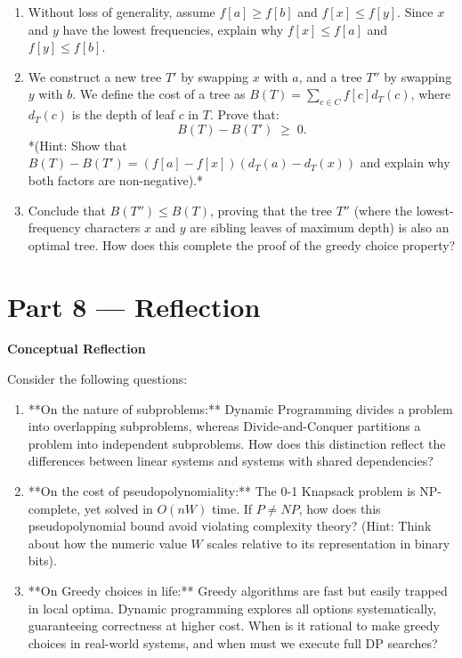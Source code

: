 \documentclass[12pt, a4paper]{book}
\begin{document}
\begin{deepbox}
\begin{enumerate}[label=\textbf{D\arabic*.}]
        \begin{enumerate}[label=(\alph*)]
          \item Without loss of generality, assume $f[a] \ge f[b]$ and $f[x] \le f[y]$.
                Since $x$ and $y$ have the lowest frequencies, explain why $f[x] \le f[a]$ and $f[y] \le f[b]$.
          \item We construct a new tree $T'$ by swapping $x$ with $a$, and a tree $T''$ by swapping $y$ with $b$.
                We define the cost of a tree as $B(T) = \sum_{c \in C} f[c] d_T(c)$, where $d_T(c)$ is the depth of leaf $c$ in $T$.
                Prove that:
                \[
                  B(T) - B(T') \;\ge\; 0.
                \]
                *(Hint: Show that $B(T) - B(T') = (f[a] - f[x])(d_T(a) - d_T(x))$ and explain why both factors are non-negative).*
          \item Conclude that $B(T'') \le B(T)$, proving that the tree $T''$ (where the lowest-frequency characters $x$ and $y$ are sibling leaves of maximum depth) is also an optimal tree.
                How does this complete the proof of the greedy choice property?
        \end{enumerate}
\end{enumerate}
\end{deepbox}

\newpage

\section{Part 8 --- Reflection}

\begin{reflectionbox}
\textbf{Conceptual Reflection}

Consider the following questions:
\begin{enumerate}
  \item **On the nature of subproblems:** Dynamic Programming divides a problem into overlapping subproblems, whereas Divide-and-Conquer partitions a problem into independent subproblems. How does this distinction reflect the differences between linear systems and systems with shared dependencies?
  \item **On the cost of pseudopolynomiality:** The 0-1 Knapsack problem is NP-complete, yet solved in $O(n W)$ time. If $P \neq NP$, how does this pseudopolynomial bound avoid violating complexity theory? (Hint: Think about how the numeric value $W$ scales relative to its representation in binary bits).
  \item **On Greedy choices in life:** Greedy algorithms are fast but easily trapped in local optima. Dynamic programming explores all options systematically, guaranteeing correctness at higher cost. When is it rational to make greedy choices in real-world systems, and when must we execute full DP searches?
\end{enumerate}
\end{reflectionbox}
\end{document}
